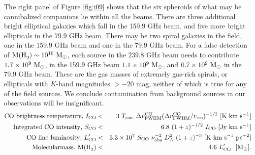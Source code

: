 \documentclass[11pt]{article}
\begin{document}
The right panel of Figure \ref{fig:i09} shows that the six spheroids
of what may be cannibalized companions lie within all the beams. There
are three additional bright elliptical galaxies which fall in the
159.9 GHz beam, and five more bright ellipticals in the 79.9 GHz
beam. There may be two spiral galaxies in the field, one in the 159.9
GHz beam and one in the 79.9 GHz beam. For a false detection of $\mathrm{M(H}_{2})
\sim 10^{10} ~\mathrm{M}_{\odot}$, each source in the 239.8 GHz beam needs to
contribute $1.7 \times 10^9 ~\mathrm{M}_{\odot}$, in the 159.9 GHz beam $1.1 \times
10^9 ~\mathrm{M}_{\odot}$, and $0.7 \times 10^9 ~\mathrm{M}_{\odot}$ in the 79.9 GHz beam. These
are the gas masses of extremely gas-rich spirals, or ellipticals with
$K$-band magnitudes $> -20$ mag, neither of which is true for any of
the field sources. We conclude contamination from background sources
in our observations will be insignificant.
\begin{eqnarray}
  \mathrm{CO ~brightness ~temperature,} ~I_{\mathrm{CO}} &<& 3
  ~T_{\mathrm{rms}} ~\Delta v^{\mathrm{CO}}_{\mathrm{FWHM}}
  (\Delta v^{\mathrm{CO}}_{\mathrm{FWHM}}/v_{\mathrm{res}})^{-1/2} ~\mathrm{[K ~km
      ~s^{-1}]}\\
  \mathrm{Integrated ~CO ~intensity,} ~S_{\mathrm{CO}} &<& 6.8
  ~(1+z)^{-1/2} ~I_{\mathrm{CO}} ~\mathrm{[Jy ~km ~s^{-1}]}\\
  \mathrm{CO ~line ~luminosity,} ~L^{\prime}_{\mathrm{CO}} &<& 3.3 \times 10^7
  ~S_{\mathrm{CO}} ~\nu_{\mathrm{obs}}^{-2} ~D_L^2 ~(1+z)^{-3}
  ~\mathrm{[K ~km ~s^{-1} ~pc^{-2}]}\\
  \mathrm{Molecular mass,} ~\mathrm{M(H}_{2}) &<& 4.6 ~L^{\prime}_{\mathrm{CO}}\ ~[\mathrm{M}_{\odot}].
\end{eqnarray}
\end{document}
